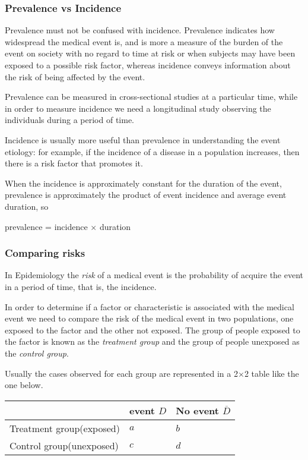 \begin{frame}
\frametitle{Prevalence vs Incidence}
Prevalence must not be confused with incidence. Prevalence indicates how widespread the medical event is, and is more a measure of the burden of the event on society with no regard to time at risk or when subjects may have been exposed to a possible risk factor, whereas incidence conveys information about the risk of being affected by the event.

Prevalence can be measured in cross-sectional studies at a particular time, while in order to measure incidence we need a longitudinal study observing the individuals during a period of time.

Incidence is usually more useful than prevalence in understanding the event etiology: for example, if the incidence of a disease in a population increases, then there is a risk factor that promotes it.

When the incidence is approximately constant for the duration of the event, prevalence is approximately the product of event incidence and average event duration, so 
\begin{center}
  prevalence = incidence $\times$ duration
\end{center}
\end{frame}
  

\begin{frame}
\frametitle{Comparing risks}
In Epidemiology the \emph{risk} of a medical event is the probability of acquire the event in a period of time, that is, the incidence. 

In order to determine if a factor or characteristic is associated with the medical event we need to compare the risk of the medical event in two populations, one exposed to the factor and the other not exposed.
The group of people exposed to the factor is known as the \emph{treatment group} and the group of people unexposed as the \emph{control group}.

Usually the cases observed for each group are represented in a 2$\times$2 table like the one below. 

\begin{center}
  \begin{tabular}{|m{3cm}|m{3cm}<{\centering}|m{3cm}<{\centering}|}
  \cline{2-3}
  \multicolumn{1}{c|}{} & event $D$ & No event $\overline D$\\ 
  \hline
  Treatment group\newline (exposed) & $a$ & $b$\\ 
  \hline 
  Control group\newline (unexposed) & $c$ & $d$\\ 
  \hline
  \end{tabular}
\end{center}
\end{frame}
  

